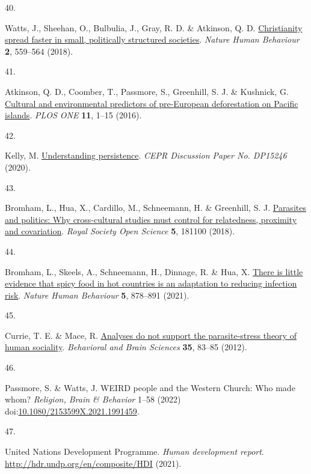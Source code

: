 \documentclass[
  man,floatsintext]{apa6}
\newlength{\cslhangindent}
\newlength{\csllabelwidth}
\newlength{\cslentryspacingunit} %
\newenvironment{CSLReferences}[2] %
 {%
  \setlength{\parindent}{0pt}
  \ifodd #1
  \let\oldpar\par
  \def\par{\hangindent=\cslhangindent\oldpar}
  \fi
  \setlength{\parskip}{#2\cslentryspacingunit}
 }%
 {}
\newcommand{\CSLLeftMargin}[1]{\parbox[t]{\csllabelwidth}{#1}}
\newcommand{\CSLRightInline}[1]{\parbox[t]{\linewidth - \csllabelwidth}{#1}\break}
\begin{document}
\begin{CSLReferences}{0}{0}
\leavevmode{}%
\CSLLeftMargin{40. }%
\CSLRightInline{Watts, J., Sheehan, O., Bulbulia, J., Gray, R. D. \& Atkinson, Q. D. \href{https://doi.org/10.1038/s41562-018-0379-3}{Christianity spread faster in small, politically structured societies}. \emph{Nature Human Behaviour} \textbf{2}, 559--564 (2018).}

\leavevmode{}%
\CSLLeftMargin{41. }%
\CSLRightInline{Atkinson, Q. D., Coomber, T., Passmore, S., Greenhill, S. J. \& Kushnick, G. \href{https://doi.org/10.1371/journal.pone.0156340}{Cultural and environmental predictors of pre-{European} deforestation on {Pacific} islands}. \emph{PLOS ONE} \textbf{11}, 1--15 (2016).}

\leavevmode{}%
\CSLLeftMargin{42. }%
\CSLRightInline{Kelly, M. \href{http://ssrn.com/abstract=3688200}{Understanding persistence}. \emph{CEPR Discussion Paper No. DP15246} (2020).}

\leavevmode{}%
\CSLLeftMargin{43. }%
\CSLRightInline{Bromham, L., Hua, X., Cardillo, M., Schneemann, H. \& Greenhill, S. J. \href{https://doi.org/10.1098/rsos.181100}{Parasites and politics: Why cross-cultural studies must control for relatedness, proximity and covariation}. \emph{Royal Society Open Science} \textbf{5}, 181100 (2018).}

\leavevmode{}%
\CSLLeftMargin{44. }%
\CSLRightInline{Bromham, L., Skeels, A., Schneemann, H., Dinnage, R. \& Hua, X. \href{https://doi.org/10.1038/s41562-020-01039-8}{There is little evidence that spicy food in hot countries is an adaptation to reducing infection risk}. \emph{Nature Human Behaviour} \textbf{5}, 878--891 (2021).}

\leavevmode{}%
\CSLLeftMargin{45. }%
\CSLRightInline{Currie, T. E. \& Mace, R. \href{https://doi.org/10.1017/S0140525X11000963}{Analyses do not support the parasite-stress theory of human sociality}. \emph{Behavioral and Brain Sciences} \textbf{35}, 83--85 (2012).}

\leavevmode{}%
\CSLLeftMargin{46. }%
\CSLRightInline{Passmore, S. \& Watts, J. {WEIRD} people and the {W}estern {C}hurch: Who made whom? \emph{Religion, Brain \& Behavior} 1--58 (2022) doi:\href{https://doi.org/10.1080/2153599X.2021.1991459}{10.1080/2153599X.2021.1991459}.}

\leavevmode{}%
\CSLLeftMargin{47. }%
\CSLRightInline{United Nations Development Programme. \emph{Human development report}. \url{http://hdr.undp.org/en/composite/HDI} (2021).}


\end{CSLReferences}
\end{document}
